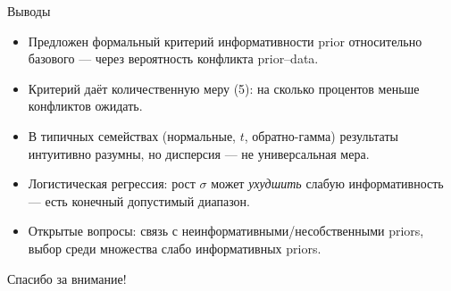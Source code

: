 \documentclass[aspectratio=169,10pt]{beamer}
\begin{document}
\begin{frame}{Выводы}
  \begin{itemize}
    \item Предложен \alert{формальный} критерий информативности prior
          относительно базового — через вероятность конфликта prior--data.
    \item Критерий даёт \alert{количественную} меру (5):
          на сколько процентов меньше конфликтов ожидать.
    \item В типичных семействах (нормальные, $t$, обратно-гамма)
          результаты интуитивно разумны,
          но \alert{дисперсия — не универсальная мера}.
    \item Логистическая регрессия: рост $\sigma$ может \emph{ухудшить}
          слабую информативность — есть конечный допустимый диапазон.
    \item Открытые вопросы: связь с неинформативными/несобственными priors,
          выбор среди множества слабо информативных priors.
  \end{itemize}

  \vspace{0.5em}
  \centering
  \alert{Спасибо за внимание!}
\end{frame}
\end{document}
